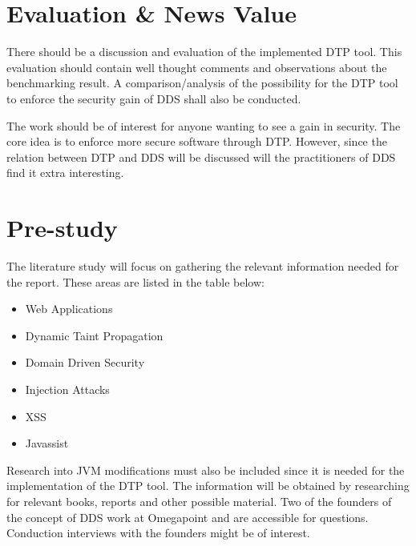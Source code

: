 \documentclass{../kththesis}
\begin{document}
\chapter{Evaluation \& News Value}
There should be a discussion and evaluation of the implemented DTP tool. This evaluation should contain well thought comments and observations about the benchmarking result. A comparison/analysis of the possibility for the DTP tool to enforce the security gain of DDS shall also be conducted. 

The work should be of interest for anyone wanting to see a gain in security. The core idea is to enforce more secure software through DTP. However, since the relation between DTP and DDS will be discussed will the practitioners of DDS find it extra interesting.



\chapter{Pre-study}
The literature study will focus on gathering the relevant information needed for the report. These areas are listed in the table below:
	
	\begin{itemize}  
		\item Web Applications
		\item Dynamic Taint Propagation
		\item Domain Driven Security
		\item Injection Attacks
		\item XSS
		\item Javassist
	\end{itemize}

\noindent
Research into JVM modifications must also be included since it is needed for the implementation of the DTP tool. The information will be obtained by researching for relevant books, reports and other possible material. Two of the founders of the concept of DDS work at Omegapoint and are accessible for questions. Conduction interviews with the founders might be of interest.
\end{document}
